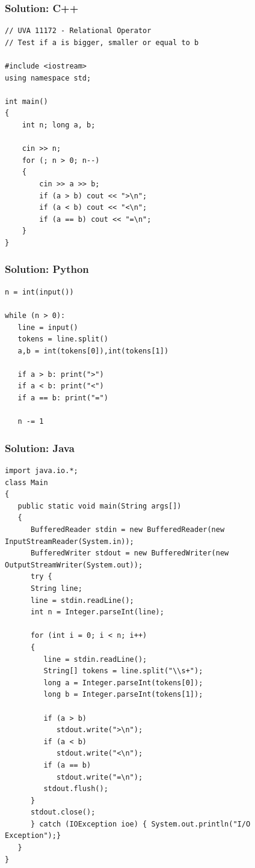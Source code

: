 \documentclass{beamer}
\begin{document}
\begin{frame}[fragile]
  \frametitle{Solution: C++}

\begin{block}{}
{\smaller
\begin{verbatim}
// UVA 11172 - Relational Operator
// Test if a is bigger, smaller or equal to b

#include <iostream>
using namespace std;

int main()
{
    int n; long a, b;

    cin >> n;
    for (; n > 0; n--)
    {
        cin >> a >> b;
        if (a > b) cout << ">\n";
        if (a < b) cout << "<\n";
        if (a == b) cout << "=\n";
    }
}
\end{verbatim}}
\end{block}
\end{frame}

\begin{frame}[fragile]
  \frametitle{Solution: Python}
  \begin{block}{}
\begin{verbatim}
n = int(input())

while (n > 0):
   line = input()
   tokens = line.split()
   a,b = int(tokens[0]),int(tokens[1])

   if a > b: print(">")
   if a < b: print("<")
   if a == b: print("=")

   n -= 1
\end{verbatim}
  \end{block}

\end{frame}

\begin{frame}[fragile]
  \frametitle{Solution: Java}

  {\tiny
  \begin{block}{}
\begin{verbatim}
import java.io.*;
class Main
{
   public static void main(String args[])
   {
      BufferedReader stdin = new BufferedReader(new InputStreamReader(System.in));
      BufferedWriter stdout = new BufferedWriter(new OutputStreamWriter(System.out));
      try {
      String line;
      line = stdin.readLine();
      int n = Integer.parseInt(line);

      for (int i = 0; i < n; i++)
      {
         line = stdin.readLine();
         String[] tokens = line.split("\\s+");
         long a = Integer.parseInt(tokens[0]);
         long b = Integer.parseInt(tokens[1]);

         if (a > b)
            stdout.write(">\n");
         if (a < b)
            stdout.write("<\n");
         if (a == b)
            stdout.write("=\n");
         stdout.flush();
      }
      stdout.close();
      } catch (IOException ioe) { System.out.println("I/O Exception");}
   }
}
\end{verbatim}
  \end{block}
  }
\end{frame}
\end{document}
